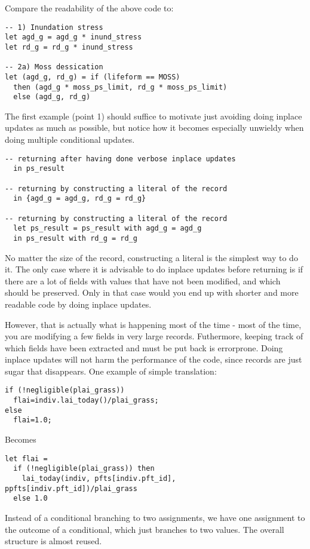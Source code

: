Compare the readability of the above code to:

\begin{verbatim}
-- 1) Inundation stress
let agd_g = agd_g * inund_stress
let rd_g = rd_g * inund_stress

-- 2a) Moss dessication
let (agd_g, rd_g) = if (lifeform == MOSS)
  then (agd_g * moss_ps_limit, rd_g * moss_ps_limit)
  else (agd_g, rd_g)
\end{verbatim}

The first example (point 1) should suffice to motivate just avoiding doing inplace updates as much as possible, but notice how it becomes especially unwieldy when doing multiple conditional updates.

\begin{verbatim}
-- returning after having done verbose inplace updates
  in ps_result

-- returning by constructing a literal of the record
  in {agd_g = agd_g, rd_g = rd_g}

-- returning by constructing a literal of the record
  let ps_result = ps_result with agd_g = agd_g
  in ps_result with rd_g = rd_g
\end{verbatim}

No matter the size of the record, constructing a literal is the simplest way to do it. The only case where it is advisable to do inplace updates before returning is if there are a lot of fields with values that have not been modified, and which should be preserved. Only in that case would you end up with shorter and more readable code by doing inplace updates.

However, that is actually what is happening most of the time - most of the time, you are modifying a few fields in very large records. Futhermore, keeping track of which fields have been extracted and must be put back is errorprone. Doing inplace updates will not harm the performance of the code, since records are just sugar that disappears. One example of simple translation:

\begin{verbatim}
if (!negligible(plai_grass))
  flai=indiv.lai_today()/plai_grass;
else
  flai=1.0;
\end{verbatim}

Becomes

\begin{verbatim}
let flai =
  if (!negligible(plai_grass)) then
    lai_today(indiv, pfts[indiv.pft_id], ppfts[indiv.pft_id])/plai_grass
  else 1.0
\end{verbatim}
Instead of a conditional branching to two assignments, we have one assignment to the outcome of a conditional, which just branches to two values. The overall structure is almost reused.


